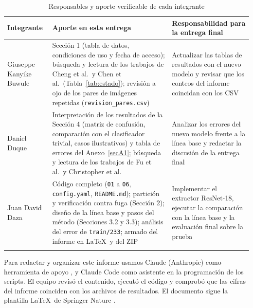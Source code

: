 \documentclass[pdflatex,sn-mathphys-num]{sn-jnl}%
\theoremstyle{thmstyleone}%
\theoremstyle{thmstyletwo}%
\theoremstyle{thmstylethree}%
\begin{document}
\begin{table}[!htbp]
\small
\caption{Responsables y aporte verificable de cada integrante}\label{tab:roles}
\begin{tabularx}{\textwidth}{@{}L{2.6cm}YY@{}}
\toprule
Integrante & Aporte en esta entrega & Responsabilidad para la entrega final \\
\midrule
Giuseppe Kanyike Buwule & Sección 1 (tabla de datos, condiciones de uso y fecha de acceso); búsqueda y lectura de los trabajos de Cheng et al.\ y Chen et al.\ (Tabla~\ref{tab:estado}); revisión a ojo de los pares de imágenes repetidas (\texttt{revision\_pares.csv}) & Actualizar las tablas de resultados con el nuevo modelo y revisar que los conteos del informe coincidan con los CSV \\
Daniel Duque & Interpretación de los resultados de la Sección 4 (matriz de confusión, comparación con el clasificador trivial, casos ilustrativos) y tabla de errores del Anexo~\ref{secA1}; búsqueda y lectura de los trabajos de Fu et al.\ y Christopher et al. & Analizar los errores del nuevo modelo frente a la línea base y redactar la discusión de la entrega final \\
Juan David Daza & Código completo (\texttt{01} a \texttt{06}, \texttt{config.yaml}, \texttt{README.md}); partición y verificación contra fuga (Sección 2); diseño de la línea base y pasos del método (Secciones 3.2 y 3.3); análisis del error de \texttt{train/233}; armado del informe en \LaTeX\ y del ZIP & Implementar el extractor ResNet-18, ejecutar la comparación con la línea base y la evaluación final sobre la prueba \\
\botrule
\end{tabularx}
\end{table}

\FloatBarrier
\backmatter


Para redactar y organizar este informe usamos Claude (Anthropic) como herramienta de apoyo \cite{anthropic2026claude}, y Claude Code como asistente en la programación de los scripts. El equipo revisó el contenido, ejecutó el código y comprobó que las cifras del informe coinciden con los archivos de resultados. El documento sigue la plantilla \LaTeX\ de Springer Nature \cite{springer2024latex}.



\end{document}
